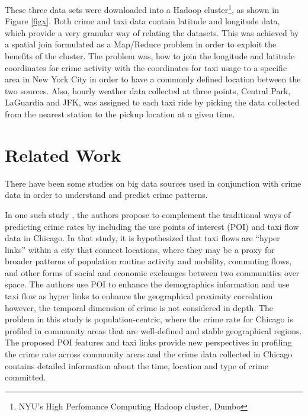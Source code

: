 \documentclass{sigkddExp}
\begin{document}

These three data sets were downloaded into a Hadoop cluster\footnote{NYU's High Perfomance Computing Hadoop cluster, Dumbo}, as shown in Figure \ref{figx}. Both crime and taxi data contain latitude and longitude data, which provide a very granular way of relating the datasets. 
This was achieved by a spatial join formulated as a Map/Reduce problem in order to exploit the benefits of the cluster. 
The problem was, how to join the  longitude and latitude coordinates for crime activity with the coordinates for taxi usage to a specific area  in New York City   in order to have a commonly defined location between the two sources.
Also, hourly weather data collected at three points, Central Park, LaGuardia and JFK, was assigned to each taxi ride by picking the data collected from the nearest station to the pickup location at a given time. 





\section{Related Work}

There have been some studies on big data sources used in conjunction with crime data in order to understand and predict crime patterns. 

In one such study \cite{Wang16}, the authors propose to complement the traditional ways of predicting crime rates by including the use points of interest (POI) and taxi flow data in Chicago.  
In that study, it is hypothesized that taxi flows are ``hyper links'' within a city that connect locations, where they may be a proxy for broader patterns of population routine activity and mobility, commuting flows, and other forms of social and economic exchanges between two communities over space. The authors use POI to enhance the demographics information and use taxi flow as hyper links to enhance the geographical proximity correlation however, the temporal dimension of crime is not considered in depth. The problem in this study is population-centric, where the crime rate for Chicago is profiled in community areas that are well-defined and stable geographical regions. The proposed POI features and taxi links provide new perspectives in profiling the crime rate across community areas and the crime data collected in Chicago contains detailed information about the time, location and type of crime committed.
\end{document}
